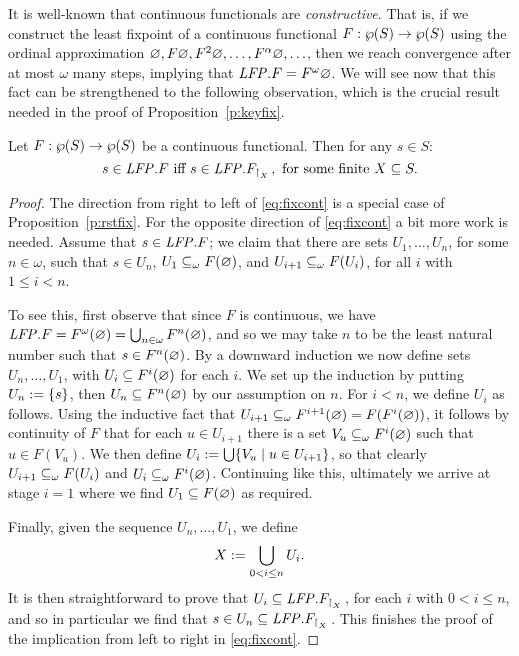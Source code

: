 It is well-known that continuous functionals are \emph{constructive}.
That is, if we construct the least fixpoint of a continuous functional $F: 
\wp(S) \to \wp(S)$ using the ordinal approximation $\varnothing, F\varnothing, F^2\varnothing, 
\ldots, F^{\alpha}\varnothing, \ldots$, then we reach convergence after at most $\omega$
many steps, implying that $\mathit{LFP}. F = F^{\omega}\varnothing$.
We will see now that this fact can be strengthened to the following observation,
which is the crucial result needed in the proof of Proposition~\ref{p:keyfix}.

\begin{theorem}
\label{t:fixcont}
Let $F: \wp(S)\to \wp(S)$ be a continuous functional.
Then for any $s \in S$:
\begin{equation}
\label{eq:fixcont}
s \in \mathit{LFP}. F \text{ iff }
s \in \mathit{LFP}.F_{{\upharpoonright}_{X}\,}, \text{ for some finite } X \subseteq S.
\end{equation}
\end{theorem}

\begin{proof}
The direction from right to left of \eqref{eq:fixcont} is a special case of 
Proposition~\ref{p:rstfix}.
For the opposite direction of \eqref{eq:fixcont} a bit more work is needed.
Assume that $s \in \mathit{LFP}. F$; we claim that there are sets $U_{1},\ldots,U_{n}$,
for some $n \in \omega$, such that $s \in U_{n}$, $U_{1} \subseteq_{\omega} F(\varnothing)$,
and $U_{i+1} \subseteq_{\omega} F(U_{i})$, for all $i$ with $1 \leq i < n$.

To see this, first observe that since $F$ is continuous, we have $\mathit{LFP}. F = 
F^{\omega}(\varnothing) = \bigcup_{n\in\omega}F^{n}(\varnothing)$, and so we may take $n$ to
be the least natural number such that $s \in F^{n}(\varnothing)$.
By a downward induction we now define sets $U_{n},\ldots,U_{1}$, with $U_{i} 
\subseteq F^{i}(\varnothing)$ for each $i$. 
We set up the induction by putting $U_{n} \mathrel{:=} \{ s \}$, then $U_{n}
\subseteq F^{n}(\varnothing)$ by our assumption on $n$.
For $i<n$, we define $U_{i}$ as follows.
Using the inductive fact that $U_{i+1} \subseteq_{\omega} F^{i+1}(\varnothing) = 
F(F^{i}(\varnothing))$, it follows by continuity of $F$ that for each $u \in U_{i+1}$
there is a set $V_{u} \subseteq_{\omega} F^{i}(\varnothing)$ such that $u \in F(V_{u})$.
We then define $U_{i} \mathrel{:=} \bigcup \{ V_{u} \mid u \in U_{i+1} \}$,
so that clearly $U_{i+1} \subseteq_{\omega} F(U_{i})$ and $U_{i} \subseteq_{\omega}
F^{i}(\varnothing)$.
Continuing like this, ultimately we arrive at stage $i=1$ where we find
$U_{1} \subseteq F(\varnothing)$ as required.

Finally, given the sequence $U_{n},\ldots,U_{1}$, we define 
\[
X \mathrel{:=}  \bigcup_{0<i\leq n} U_{i}.
\]
It is then straightforward to prove that $U_{i} \subseteq \mathit{LFP}. F_{{\upharpoonright}_{X}\,}$, for each 
$i$ with $0<i\leq n$, and so in particular we find that $s \in U_{n} \subseteq \mathit{LFP}.
F_{{\upharpoonright}_{X}\,}$.
This finishes the proof of the implication from left to right in 
\eqref{eq:fixcont}.
\end{proof}

